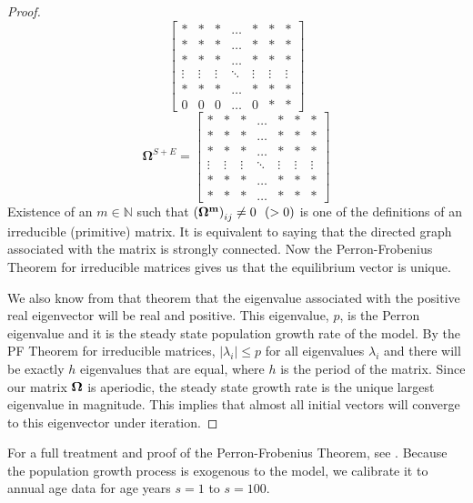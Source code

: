 \documentclass[letterpaper,12pt]{article}
\theoremstyle{definition}
\begin{document}
\begin{proof}
$$\begin{bmatrix}
        * & *  & * & \hdots & * & * & *\\
        * & * & * & \hdots & * & * & * \\
        * & * & * & \hdots & * & * & * \\
        \vdots & \vdots & \vdots & \ddots & \vdots & \vdots & \vdots \\
        * & * & * & \hdots & *  & * & * \\
        0 & 0 & 0 & \hdots & 0 & * & *
      \end{bmatrix}
      $$
      $$\bm{\Omega}^{S+E} =
      \begin{bmatrix}
        * & *  & * & \hdots & * & * & *\\
        * & * & * & \hdots & * & * & * \\
        * & * & * & \hdots & * & * & * \\
        \vdots & \vdots & \vdots & \ddots & \vdots & \vdots & \vdots \\
        * & * & * & \hdots & * & * & * \\
        * & * & * & \hdots & * & * & *
      \end{bmatrix}
      $$
      Existence of an $m \in \mathbb N $ such that $\left(\bf\Omega^m\right)_{ij} \neq 0 ~~ ( > 0)$ is one of the definitions of an irreducible (primitive) matrix. It is equivalent to saying that the directed graph associated with the matrix is strongly connected. Now the Perron-Frobenius Theorem for irreducible matrices gives us that the equilibrium vector is unique.

      We also know from that theorem that the eigenvalue associated with the positive real eigenvector will be real and positive. This eigenvalue, $p$, is the Perron eigenvalue and it is the steady state population growth rate of the model. By the PF Theorem for irreducible matrices, $| \lambda_i | \leq p$ for all eigenvalues $\lambda_i$ and there will be exactly $h$ eigenvalues that are equal, where $h$ is the period of the matrix. Since our matrix $\bf\Omega$ is aperiodic, the steady state growth rate is the unique largest eigenvalue in magnitude. This implies that almost all initial vectors will converge to this eigenvector under iteration.
    \end{proof}

    For a full treatment and proof of the Perron-Frobenius Theorem, see \citet{Suzumura:1983}. Because the population growth process is exogenous to the model, we calibrate it to annual age data for age years $s=1$ to $s=100$.
\end{document}
